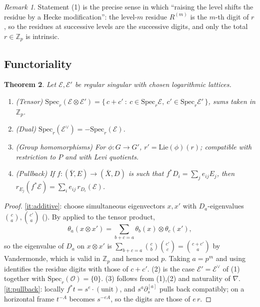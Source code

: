 \documentclass[11pt,reqno]{amsart}
\newcommand{\Zp}{\mathbb{Z}_p}
\newcommand{\cO}{\mathcal{O}}
\newcommand{\cE}{\mathcal{E}}
\theoremstyle{plain}
\newtheorem{theorem}{Theorem}[section]
\theoremstyle{definition}
\theoremstyle{remark}
\newtheorem{remark}[theorem]{Remark}
\numberwithin{equation}{section}
\begin{document}
\begin{remark}
Statement (1) is the precise sense in which ``raising the level shifts the
residue by a Hecke modification'': the level-$m$ residue $R^{(m)}$ is the
$m$-th digit of $r$, so the residues at successive levels are the
successive digits, and only the total $r\in\Zp$ is intrinsic.
\end{remark}

\subsection{Functoriality}
\begin{theorem}\label{thm:functoriality}
Let $\cE,\cE'$ be regular singular with chosen logarithmic lattices.
\begin{enumerate}
\item\label{it:additive} (Tensor)
      $\mathrm{Spec}_r(\cE\otimes\cE')=
      \{\,c+c'\ :\ c\in\mathrm{Spec}_r\cE,\ c'\in\mathrm{Spec}_r\cE'\,\}$,
      sums taken in $\Zp$.
\item (Dual) $\mathrm{Spec}_r(\cE^\vee)=-\mathrm{Spec}_r(\cE)$.
\item (Group homomorphisms) For $\phi\colon G\to G'$, $r'=\mathrm{Lie}(\phi)(r)$;
      compatible with restriction to $P$ and with Levi quotients.
\item\label{it:pullback} (Pullback) If $f\colon(\bar Y,E)\to(\bar X,D)$ is
      such that $f^*D_i=\sum_j e_{ij}E_j$, then
      $r_{E_j}(f^*\cE)=\sum_i e_{ij}\,r_{D_i}(\cE)$.
\end{enumerate}
\end{theorem}
\begin{proof}
\eqref{it:additive}: choose simultaneous eigenvectors $x,x'$ with
$D_a$-eigenvalues $\binom{c}{a},\binom{c'}{a}$ ().  By
 applied to the tensor product,
\[
   \theta_a(x\otimes x')=\sum_{b+c=a}\theta_b(x)\otimes\theta_c(x'),
\]
so the eigenvalue of $D_a$ on $x\otimes x'$ is
$\sum_{b+c=a}\binom{c}{b}\binom{c'}{c}=\binom{c+c'}{a}$ by Vandermonde,
which is valid in $\Zp$ and hence mod $p$.  Taking $a=p^m$ and using
 identifies the residue digits with those of $c+c'$.
(2) is the case $\cE'=\cE^\vee$ of (1) together with
$\mathrm{Spec}_r(\cO)=\{0\}$.
(3) follows from (1),(2) and naturality of $\nabla$.
\eqref{it:pullback}: locally $f^*t=s^{e}\cdot(\text{unit})$, and
$s^{a}\partial_s^{[a]}$ pulls back compatibly; on a horizontal frame
$t^{-A}$ becomes $s^{-eA}$, so the digits are those of $e\,r$.
\end{proof}
\end{document}
